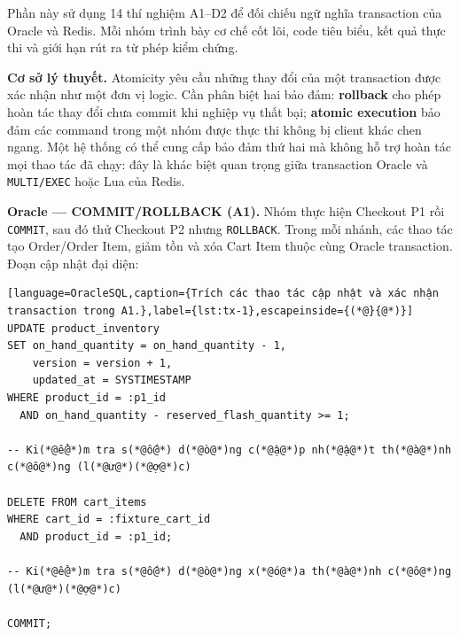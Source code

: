 \label{sec:tx-2}
Phần này sử dụng 14 thí nghiệm A1–D2 để đối chiếu ngữ nghĩa transaction của Oracle và Redis. Mỗi nhóm trình bày cơ chế cốt lõi, code tiêu biểu, kết quả thực thi và giới hạn rút ra từ phép kiểm chứng.

\label{sec:tx-2-1}
\textbf{Cơ sở lý thuyết.} Atomicity yêu cầu những thay đổi của một transaction được xác nhận như một đơn vị logic. Cần phân biệt hai bảo đảm: \textbf{rollback} cho phép hoàn tác thay đổi chưa commit khi nghiệp vụ thất bại; \textbf{atomic execution} bảo đảm các command trong một nhóm được thực thi không bị client khác chen ngang. Một hệ thống có thể cung cấp bảo đảm thứ hai mà không hỗ trợ hoàn tác mọi thao tác đã chạy: đây là khác biệt quan trọng giữa transaction Oracle và \texttt{MULTI/\allowbreak{}EXEC} hoặc Lua của Redis.

\textbf{Oracle — COMMIT/ROLLBACK (A1).} Nhóm thực hiện Checkout P1 rồi \texttt{COMMIT}, sau đó thử Checkout P2 nhưng \texttt{ROLLBACK}. Trong mỗi nhánh, các thao tác tạo Order/Order Item, giảm tồn và xóa Cart Item thuộc cùng Oracle transaction. Đoạn cập nhật đại diện:

\begin{lstlisting}[language=OracleSQL,caption={Trích các thao tác cập nhật và xác nhận transaction trong A1.},label={lst:tx-1},escapeinside={(*@}{@*)}]
UPDATE product_inventory
SET on_hand_quantity = on_hand_quantity - 1,
    version = version + 1,
    updated_at = SYSTIMESTAMP
WHERE product_id = :p1_id
  AND on_hand_quantity - reserved_flash_quantity >= 1;

-- Ki(*@ể@*)m tra s(*@ố@*) d(*@ò@*)ng c(*@ậ@*)p nh(*@ậ@*)t th(*@à@*)nh c(*@ô@*)ng (l(*@ư@*)(*@ợ@*)c)

DELETE FROM cart_items
WHERE cart_id = :fixture_cart_id
  AND product_id = :p1_id;

-- Ki(*@ể@*)m tra s(*@ố@*) d(*@ò@*)ng x(*@ó@*)a th(*@à@*)nh c(*@ô@*)ng (l(*@ư@*)(*@ợ@*)c)

COMMIT;
\end{lstlisting}

